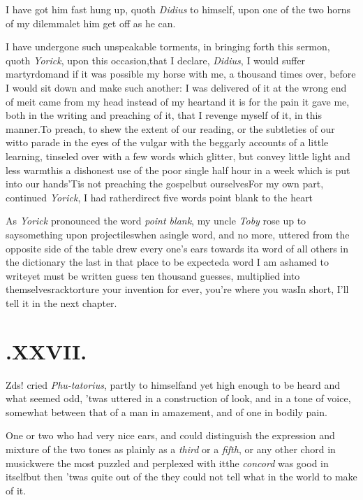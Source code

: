 \documentclass[twoside]{article}
\begin{document}
\tsk I have got him fast hung up, quoth \textit{Didius}
to himself, upon one of the two horns of my
dilemma\tsh let him get off as he can.

I have undergone such unspeakable torments, in bringing
forth this sermon, quoth \textit{Yorick}, upon this
occasion,\tsk that I declare, \textit{Didius}, I would suffer
martyrdom\tsk and if it was possible my horse with me, a
thousand times over, before I would sit down and make such
another: I was delivered of it at the wrong end of me\tsk it
came from my head instead of my heart\tsk and it is for the
pain it gave me, both in the writing and preaching of it,
that I revenge myself of it, in this manner.\tsk To preach,
to shew the extent of our reading, or the subtleties of our
wit\tsk to parade in the eyes of the vulgar with the
beggarly accounts of a little learning, tinseled over with a
few words which glitter, but convey little light and less
warmth\tsk is a dishonest use of the poor single half hour
in a week which is put into our hands\tsk ’Tis not
preaching
the gospel\tsk but ourselves\tsk For my own part, continued
\textit{Yorick}, I had rather\break direct five words point blank
to the\break 
heart\tsk

As \textit{Yorick} pronounced the word \textit{point blank},
my uncle \textit{Toby} rose up to say\break something upon
projectiles\tsh when a\break single word, and no more, uttered
from the opposite side of the table drew every one’s ears
towards it\tsk a word of all others in the dictionary the
last in that place to be expected\tsk a word I am ashamed to
write\tsk yet must be written
 guess ten thousand guesses,
multiplied into themselves\tsk rack\tsk torture your
invention for ever, you’re where you was\tsk\break In short,
I’ll tell it in the next chapter.

\null\smallskip
\section{.\enspace XXVII.}

\tsh\tsh\break
\tsh\tsh\tsh\tsh\tsk\break
\tsh\tsh\tsk Z\tsh ds!  cried \textit{Phu-\break tatorius},
partly to himself\tsk and yet high enough to be heard\tsk
and what seemed odd, ’twas uttered in a construction of
look, and in a tone of voice, somewhat between that of a man
in amazement,\break
and of one in bodily pain.

One or two who had very nice ears, and could distinguish the
expression and mixture of the two tones as plainly as a
\textit{third} or a \textit{fifth}, or any other chord in musick\tsk were the most puzzled and perplexed
with it\tsk the \textit{concord} was good in itself\tsk but then
’twas quite out of the
they could not tell what in the world to make of it.
\end{document}

